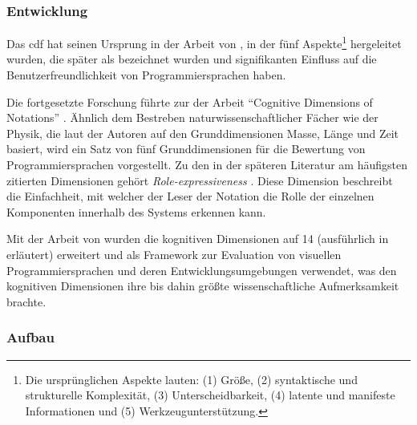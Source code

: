 \begin{important}
\subsubsection{Entwicklung}

Das \gls{cdf} hat seinen Ursprung in der Arbeit von \cite{doi:10.1080/00140138008924799}, in der fünf Aspekte\footnote{Die ursprünglichen Aspekte lauten: (1) Größe, (2) syntaktische und strukturelle Komplexität, (3) Unterscheidbarkeit, (4) latente und manifeste Informationen und (5) Werkzeugunterstützung.} hergeleitet wurden, die später als  bezeichnet wurden und signifikanten Einfluss auf die Benutzerfreundlichkeit von Programmiersprachen haben.

Die fortgesetzte Forschung führte zur der Arbeit ``Cognitive Dimensions of Notations'' \citep{Green:1989wb}. Ähnlich dem Bestreben naturwissenschaftlicher Fächer wie der Physik, die laut der Autoren auf den Grunddimensionen Masse, Länge und Zeit basiert, wird ein Satz von fünf Grunddimensionen für die Bewertung von Programmiersprachen vorgestellt. Zu den in der späteren Literatur am häufigsten zitierten Dimensionen  gehört \emph{Role-expressiveness} \citep{Teasley:1994gr,Green:1996gm,GreenCognitive,Corritore:1999bd,161956,Crosby02theroles,Anonymous:9HSMlhmF,Ko:2004fc,clarke:2006,UmerFarooq:2010tt,Farooq:2010iv,Gross:2010iz}. Diese Dimension beschreibt die Einfachheit, mit welcher der Leser der Notation die Rolle der einzelnen Komponenten innerhalb des Systems erkennen kann.

Mit der Arbeit von \cite{Green:1996gm} wurden die kognitiven Dimensionen auf 14 (ausführlich in \cite{carroll2003hci} erläutert) erweitert und als Framework zur Evaluation von visuellen Programmiersprachen und deren Entwicklungsumgebungen verwendet, was den kognitiven Dimensionen ihre bis dahin größte wissenschaftliche Aufmerksamkeit brachte.


\subsubsection{Aufbau}


\end{important}
